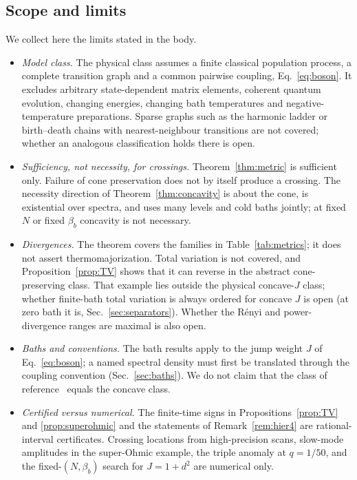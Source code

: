 \documentclass[11pt,a4paper]{article}
\theoremstyle{remark}\newtheorem{remark}[theorem]{Remark}
\begin{document}
\subsection{Scope and limits}\label{sec:scope}
We collect here the limits stated in the body.
\begin{itemize}
\item \emph{Model class.} The physical class assumes a finite classical population process, a complete transition graph and a common pairwise coupling, Eq.~\eqref{eq:boson}. It excludes arbitrary state-dependent matrix elements, coherent quantum evolution, changing energies, changing bath temperatures and negative-temperature preparations. Sparse graphs such as the harmonic ladder or birth--death chains with nearest-neighbour transitions are not covered; whether an analogous classification holds there is open.
\item \emph{Sufficiency, not necessity, for crossings.} Theorem~\ref{thm:metric} is sufficient only. Failure of cone preservation does not by itself produce a crossing. The necessity direction of Theorem~\ref{thm:concavity} is about the cone, is existential over spectra, and uses many levels and cold baths jointly; at fixed $N$ or fixed $\beta_b$ concavity is not necessary.
\item \emph{Divergences.} The theorem covers the families in Table~\ref{tab:metrics}; it does not assert thermomajorization. Total variation is not covered, and Proposition~\ref{prop:TV} shows that it can reverse in the abstract cone-preserving class. That example lies outside the physical concave-$J$ class; whether finite-bath total variation is always ordered for concave $J$ is open (at zero bath it is, Sec.~\ref{sec:separators}). Whether the R\'enyi and power-divergence ranges are maximal is also open.
\item \emph{Baths and conventions.} The bath results apply to the jump weight $J$ of Eq.~\eqref{eq:boson}; a named spectral density must first be translated through the coupling convention (Sec.~\ref{sec:baths}). We do not claim that the class of reference~\cite{Avitan2026} equals the concave class.
\item \emph{Certified versus numerical.} The finite-time signs in Propositions~\ref{prop:TV} and \ref{prop:superohmic} and the statements of Remark~\ref{rem:hier4} are rational-interval certificates. Crossing locations from high-precision scans, slow-mode amplitudes in the super-Ohmic example, the triple anomaly at $q=1/50$, and the fixed-$(N,\beta_b)$ search for $J=1+d^2$ are numerical only.

\end{itemize}
\end{document}

